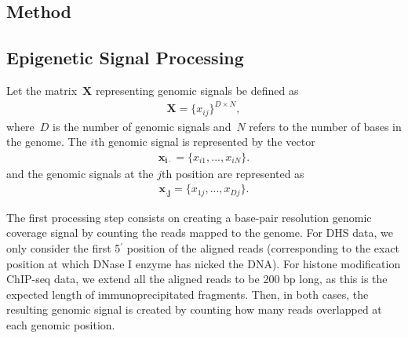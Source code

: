 \documentclass{bioinfo}
\begin{document}
\begin{methods}
\section{Method}
\label{sec:method}

\subsection{Epigenetic Signal Processing}
\label{sec:signal.processing}

Let the matrix~$\mathbf{X}$ representing genomic signals be defined as
\begin{align*}
    \mathbf{X} = {\{{x}_{ij}\}}^{D \times N},
\end{align*}
where~$ D $ is the number of genomic signals and~$N$ refers to the
number of bases in the genome. The $i$th genomic signal is
represented by the vector
\begin{align*}
    \mathbf{{x}_{i\cdot}} = \{{x}_{i1},...,{x}_{iN}\}.
\end{align*}
and the genomic signals at the $j$th position are represented as 
\begin{align*}
    \mathbf{{x}_{\cdot j}} = \{{x}_{1j},...,{x}_{Dj}\}.
\end{align*}

The first processing step consists on creating a base-pair resolution
genomic coverage signal by counting the reads mapped to the genome.
For DHS data, we only consider the first 5$^\prime$ position of
the aligned reads (corresponding to the exact position at which DNase
I enzyme has nicked the DNA). For histone modification ChIP-seq data,
we extend all the aligned {\color{red} reads to be 200 bp long}, as this is the
expected length of immunoprecipitated fragments. Then, in both cases,
the resulting genomic signal is created by counting how many
reads overlapped at each genomic position.


\end{methods}
\end{document}
